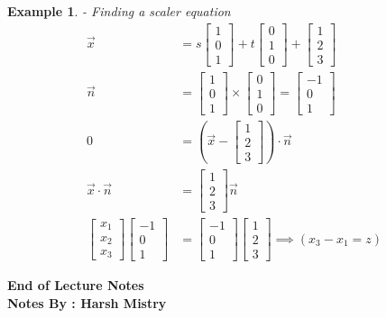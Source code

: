 \documentclass{article}
\newtheorem{ex}[theorem]{Example}
\begin{document}
\begin{ex} - Finding a scaler equation \\
\[ \begin{aligned} \vec{x} & = s \begin{bmatrix} 1 \\ 0 \\ 1\end{bmatrix} + t\begin{bmatrix} 0 \\ 1 \\ 0\end{bmatrix} + \begin{bmatrix} 1 \\ 2 \\ 3\end{bmatrix} \\
\vec{n} & = \begin{bmatrix} 1 \\ 0 \\ 1 \end{bmatrix} \times \begin{bmatrix} 0 \\ 1 \\ 0\end{bmatrix} = \begin{bmatrix} -1 \\ 0 \\ 1\end{bmatrix} \\
0 & = ( \vec{x} - \begin{bmatrix} 1 \\ 2 \\ 3 \end{bmatrix}) \cdot \vec{n}  \\
\vec{x} \cdot \vec{n}  & = \begin{bmatrix} 1 \\ 2 \\ 3 \end{bmatrix} \vec{n} \\
\begin{bmatrix} x_1 \\ x_2 \\ x_3 \end{bmatrix} \begin{bmatrix} -1 \\ 0 \\ 1\end{bmatrix} & =  \begin{bmatrix} -1 \\ 0 \\ 1\end{bmatrix} \begin{bmatrix} 1 \\ 2 \\ 3 \end{bmatrix} \implies (x_3 - x_1 = z) \end{aligned}\]
\end{ex}



\begin{center}
\textbf{End of Lecture Notes} \\
\textbf{Notes By : Harsh Mistry}
\end{center}
\end{document}
